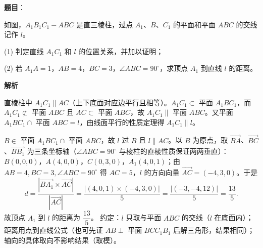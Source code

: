 \begin{answer}

\textbf{题目}：

如图，$A_1B_1C_1-ABC$ 是直三棱柱，过点 $A_1\text{、}B\text{、}C_1$ 的平面和平面 $ABC$ 的交线记作 $l$。

(1) 判定直线 $A_1C_1$ 和 $l$ 的位置关系，并加以证明；

(2) 若 $A_1A=1$，$AB=4$，$BC=3$，$\angle ABC=90^\circ$，求顶点 $A_1$ 到直线 $l$ 的距离。
\nopagebreak[4]
\begin{center}\end{center}
\nopagebreak[4]
\textbf{解析}


直棱柱中 $A_1C_1\parallel AC$（上下底面对应边平行且相等）。$A_1C_1\subset$ 平面 $A_1BC_1$，而 $A_1C_1\not\subset$ 平面 $ABC$ 且 $AC\subset$ 平面 $ABC$，故 $A_1C_1\parallel$ 平面 $ABC$。又平面 $A_1BC_1\cap$ 平面 $ABC=l$，由线面平行的性质定理得 $A_1C_1\parallel l$。


$B\in$ 平面 $A_1BC_1\cap$ 平面 $ABC$，故 $l$ 过 $B$ 且 $l\parallel AC$。以 $B$ 为原点，取 $\overrightarrow{BA}$、$\overrightarrow{BC}$、$\overrightarrow{BB_1}$ 为三条坐标轴（$\angle ABC=90^\circ$ 与棱柱的直棱性质保证两两垂直）：$B(0,0,0)$，$A(4,0,0)$，$C(0,3,0)$，$A_1(4,0,1)$；由 $AB=4,BC=3,\angle ABC=90^\circ$ 得 $AC=5$，$l$ 的方向向量 $\overrightarrow{AC}=(-4,3,0)$。于是
\nopagebreak[4]
\[d=\frac{|\overrightarrow{BA_1}\times\overrightarrow{AC}|}{|\overrightarrow{AC}|}=\frac{|(4,0,1)\times(-4,3,0)|}{5}=\frac{|(-3,-4,12)|}{5}=\frac{13}{5}.\]
故顶点 $A_1$ 到 $l$ 的距离为 $\dfrac{13}{5}$。
约定：$l$ 只取与平面 $ABC$ 的交线（$l$ 在底面内）；距离用点到直线公式（也可先证 $AB\perp$ 平面 $BCC_1B_1$ 后解三角形，结果相同）；轴向的具体取向不影响结果（取模）。



\end{answer}
